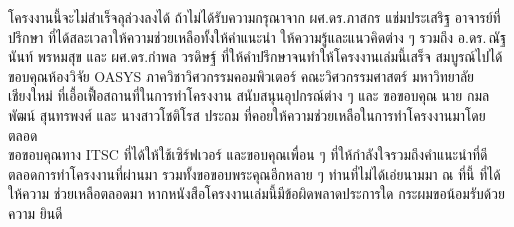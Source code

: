 \iffalse
\begin{dedication}
This document is dedicated to all Chiang Mai University students.

Dedication page is optional.
\end{dedication}
\fi %

\begin{acknowledgments}
\indent โครงงานนี้จะไม่สำเร็จลุล่วงลงได้ ถ้าไม่ได้รับความกรุณาจาก ผศ.ดร.ภาสกร แช่มประเสริฐ
อาจารย์ที่ปรึกษา ที่ได้สละเวลาให้ความช่วยเหลือทั้งให้คำแนะนำ ให้ความรู้และแนวคิดต่าง ๆ รวมถึง
อ.ดร.\,ณัฐนันท์ พรหมสุข และ ผศ.ดร.กำพล วรดิษฐ์ ที่ให้คำปรึกษาจนทำให้โครงงานเล่มนี้เสร็จ
สมบูรณ์ไปได้ \\
\indent ขอบคุณห้องวิจัย OASYS ภาควิชาวิศวกรรมคอมพิวเตอร์ คณะวิศวกรรมศาสตร์
มหาวิทยาลัยเชียงใหม่ ที่เอื้อเฟื้อสถานที่ในการทำโครงงาน สนับสนุนอุปกรณ์ต่าง ๆ และ
ขอขอบคุณ นาย กมลพัฒน์ สุนทรพงศ์ และ นางสาวโชติโรส ประถม ที่คอยให้ความช่วยเหลือในการทำโครงงานมาโดยตลอด \\
\indent ขอขอบคุณทาง ITSC ที่ได้ให้ใช้เซิร์ฟเวอร์ และขอบคุณเพื่อน ๆ ที่ให้กำลังใจรวมถึงคำแนะนำที่ดีตลอดการทำโครงงานที่ผ่านมา 
รวมทั้งขอขอบพระคุณอีกหลาย ๆ ท่านที่ไม่ได้เอ่ยนามมา ณ ที่นี้ ที่ได้ให้ความ
ช่วยเหลือตลอดมา หากหนังสือโครงงานเล่มนี้มีข้อผิดพลาดประการใด กระผมขอน้อมรับด้วยความ
ยินดี



\end{acknowledgments}%
\fi %

\contentspage

\ifproject

\fi %



